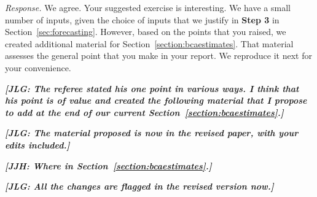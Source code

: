 \noindent \textit{Response.} We agree. Your suggested exercise is interesting. We have a small number of inputs, given the choice of inputs that we justify in \textbf{Step 3} in Section~\ref{sec:forecasting}. However, based on the points that you raised, we created additional material for Section~\ref{section:bcaestimates}. That material assesses the general point that you make in your report. We reproduce it next for your convenience. 

\textit{\textbf{[JLG: The referee stated his one point in various ways. I think that his point is of value and created the following material that I propose to add at the end of our current Section~\ref{section:bcaestimates}.]}}

\textit{\textbf{[JLG: The material proposed is now in the revised paper, with your edits included.]}}

\textit{\textbf{[JJH: Where in Section~\ref{section:bcaestimates}.]}}

\textit{\textbf{[JLG: All the changes are flagged in the revised version now.]}}

\singlespace




